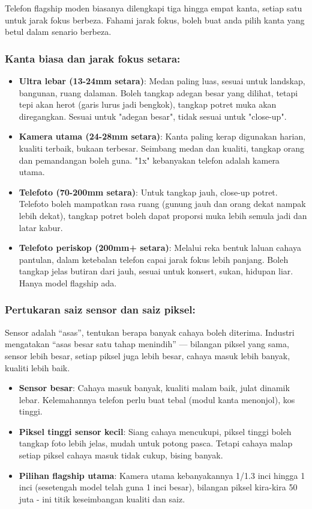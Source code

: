 
Telefon flagship moden biasanya dilengkapi tiga hingga empat kanta, setiap satu untuk jarak fokus berbeza. Fahami jarak fokus, boleh buat anda pilih kanta yang betul dalam senario berbeza.

\subsubsection*{Kanta biasa dan jarak fokus setara:}

\begin{itemize}
  \item \textbf{Ultra lebar (13-24mm setara)}: Medan paling luas, sesuai untuk landskap, bangunan, ruang dalaman. Boleh tangkap adegan besar yang dilihat, tetapi tepi akan herot (garis lurus jadi bengkok), tangkap potret muka akan diregangkan. Sesuai untuk "adegan besar", tidak sesuai untuk "close-up".
  \item \textbf{Kamera utama (24-28mm setara)}: Kanta paling kerap digunakan harian, kualiti terbaik, bukaan terbesar. Seimbang medan dan kualiti, tangkap orang dan pemandangan boleh guna. "1x" kebanyakan telefon adalah kamera utama.
  \item \textbf{Telefoto (70-200mm setara)}: Untuk tangkap jauh, close-up potret. Telefoto boleh mampatkan rasa ruang (gunung jauh dan orang dekat nampak lebih dekat), tangkap potret boleh dapat proporsi muka lebih semula jadi dan latar kabur.
  \item \textbf{Telefoto periskop (200mm+ setara)}: Melalui reka bentuk laluan cahaya pantulan, dalam ketebalan telefon capai jarak fokus lebih panjang. Boleh tangkap jelas butiran dari jauh, sesuai untuk konsert, sukan, hidupan liar. Hanya model flagship ada.
\end{itemize}

\subsubsection*{Pertukaran saiz sensor dan saiz piksel:}

Sensor adalah “asas”, tentukan berapa banyak cahaya boleh diterima. Industri mengatakan “asas besar satu tahap menindih” — bilangan piksel yang sama, sensor lebih besar, setiap piksel juga lebih besar, cahaya masuk lebih banyak, kualiti lebih baik.

\begin{itemize}
  \item \textbf{Sensor besar}: Cahaya masuk banyak, kualiti malam baik, julat dinamik lebar. Kelemahannya telefon perlu buat tebal (modul kanta menonjol), kos tinggi.
  \item \textbf{Piksel tinggi sensor kecil}: Siang cahaya mencukupi, piksel tinggi boleh tangkap foto lebih jelas, mudah untuk potong pasca. Tetapi cahaya malap setiap piksel cahaya masuk tidak cukup, bising banyak.
  \item \textbf{Pilihan flagship utama}: Kamera utama kebanyakannya 1/1.3 inci hingga 1 inci (sesetengah model telah guna 1 inci besar), bilangan piksel kira-kira 50 juta - ini titik keseimbangan kualiti dan saiz.
\end{itemize}

